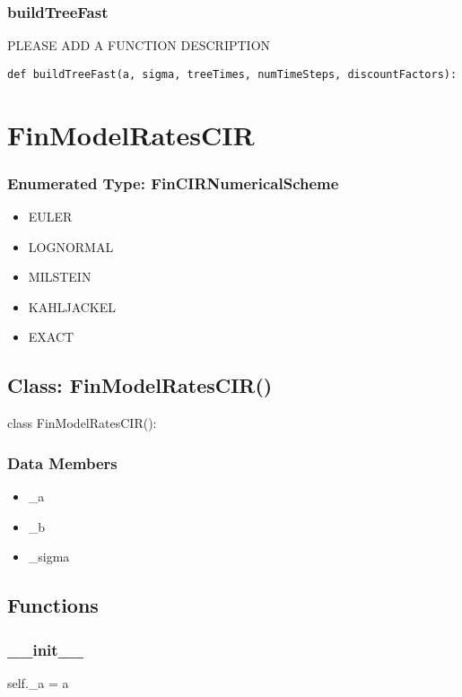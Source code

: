 \documentclass[twoside,11pt]{book}
\begin{document}
\subsubsection*{{\bf buildTreeFast}}
PLEASE ADD A FUNCTION DESCRIPTION

\begin{lstlisting}
def buildTreeFast(a, sigma, treeTimes, numTimeSteps, discountFactors):
\end{lstlisting}

\newpage
\section{FinModelRatesCIR}

\subsubsection{Enumerated Type: FinCIRNumericalScheme}
\begin{itemize}
\item{EULER}
\item{LOGNORMAL}
\item{MILSTEIN}
\item{KAHLJACKEL}
\item{EXACT}
\end{itemize}

\subsection*{Class: FinModelRatesCIR()}
class FinModelRatesCIR(): 

\subsubsection*{Data Members}
\begin{itemize}
\item{\_a}
\item{\_b}
\item{\_sigma}
\end{itemize}

\subsection*{Functions}

\subsubsection*{{\bf \_\_init\_\_}}
self.\_a = a 
\end{document}
